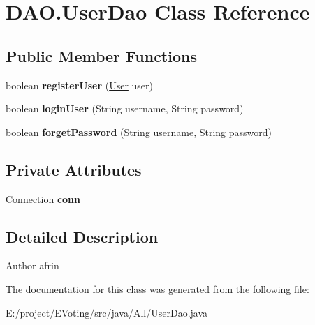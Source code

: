 \hypertarget{class_d_a_o_1_1_user_dao}{}\section{D\+A\+O.\+User\+Dao Class Reference}
\label{class_d_a_o_1_1_user_dao}
\subsection*{Public Member Functions}
\begin{DoxyCompactItemize}
\item 
\mbox{\label{class_d_a_o_1_1_user_dao_a988771b6cec7a8636d907ef52738edba}} 
boolean {\bfseries register\+User} (\mbox{\hyperlink{class_models_1_1_user}{User}} user)
\item 
\mbox{\label{class_d_a_o_1_1_user_dao_afe28d414a03d80657c357345ca4c6292}} 
boolean {\bfseries login\+User} (String username, String password)
\item 
\mbox{\label{class_d_a_o_1_1_user_dao_ae5624caad69c1ddd0f9aa48baeda5c89}} 
boolean {\bfseries forget\+Password} (String username, String password)
\end{DoxyCompactItemize}
\subsection*{Private Attributes}
\begin{DoxyCompactItemize}
\item 
\mbox{\label{class_d_a_o_1_1_user_dao_ae631c2d98f475cd0b1be88971ef83ad4}} 
Connection {\bfseries conn}
\end{DoxyCompactItemize}


\subsection{Detailed Description}
\begin{DoxyAuthor}{Author}
afrin 
\end{DoxyAuthor}


The documentation for this class was generated from the following file\+:\begin{DoxyCompactItemize}
\item 
E\+:/project/\+E\+Voting/src/java/\+All/User\+Dao.\+java\end{DoxyCompactItemize}
